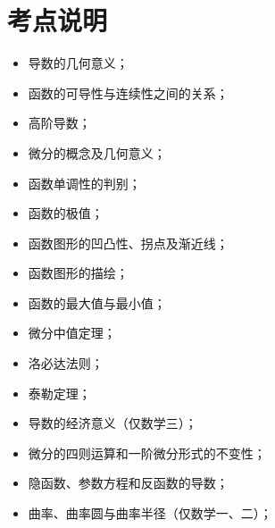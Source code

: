 \section{考点说明}
\begin{itemize}
\item 导数的几何意义；
\item 函数的可导性与连续性之间的关系；
\item 高阶导数；
\item 微分的概念及几何意义；
\item 函数单调性的判别；
\item 函数的极值；
\item 函数图形的凹凸性、拐点及渐近线；
\item 函数图形的描绘；
\item 函数的最大值与最小值；
\item 微分中值定理；
\item 洛必达法则；
\item 泰勒定理；
\item 导数的经济意义（仅数学三）；
\item 微分的四则运算和一阶微分形式的不变性；
\item 隐函数、参数方程和反函数的导数；
\item 曲率、曲率圆与曲率半径（仅数学一、二）；
\end{itemize}

